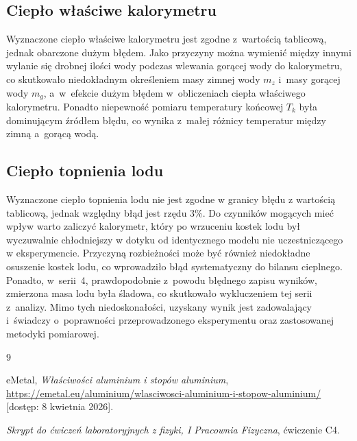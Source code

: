 \documentclass[12pt, a4paper]{article}
\begin{document}
\subsection{Ciepło właściwe kalorymetru}
Wyznaczone ciepło właściwe kalorymetru jest zgodne z~wartością tablicową, jednak obarczone dużym błędem. Jako przyczyny można wymienić między innymi wylanie się drobnej ilości wody podczas wlewania gorącej wody do kalorymetru, co skutkowało niedokładnym określeniem masy zimnej wody $m_z$ i~masy gorącej wody $m_g$, a~w~efekcie dużym błędem w~obliczeniach ciepła właściwego kalorymetru. Ponadto niepewność pomiaru temperatury końcowej $T_k$ była dominującym źródłem błędu, co wynika z~małej różnicy temperatur między zimną a~gorącą wodą.

\subsection{Ciepło topnienia lodu}
Wyznaczone ciepło topnienia lodu nie jest zgodne w granicy błędu z wartością tablicową, jednak względny błąd jest rzędu 3\%. Do czynników mogących mieć wpływ warto zaliczyć kalorymetr, który po wrzuceniu kostek lodu był wyczuwalnie chłodniejszy w dotyku od identycznego modelu nie uczestniczącego w eksperymencie. Przyczyną rozbieżności może być również niedokładne osuszenie kostek lodu, co wprowadziło błąd systematyczny do bilansu cieplnego. Ponadto, w~serii~4, prawdopodobnie z~powodu błędnego zapisu wyników, zmierzona masa lodu była śladowa, co skutkowało wykluczeniem tej serii z~analizy. Mimo tych niedoskonałości, uzyskany wynik jest zadowalający i~świadczy o~poprawności przeprowadzonego eksperymentu oraz zastosowanej metodyki pomiarowej.

\begin{thebibliography}{9}

eMetal,
\textit{Właściwości aluminium i stopów aluminium},
\url{https://emetal.eu/aluminium/wlasciwosci-aluminium-i-stopow-aluminium/}
[dostęp: 8 kwietnia 2026].

\textit{Skrypt do ćwiczeń laboratoryjnych z fizyki, I Pracownia Fizyczna}, ćwiczenie C4.

\end{thebibliography}
\end{document}

